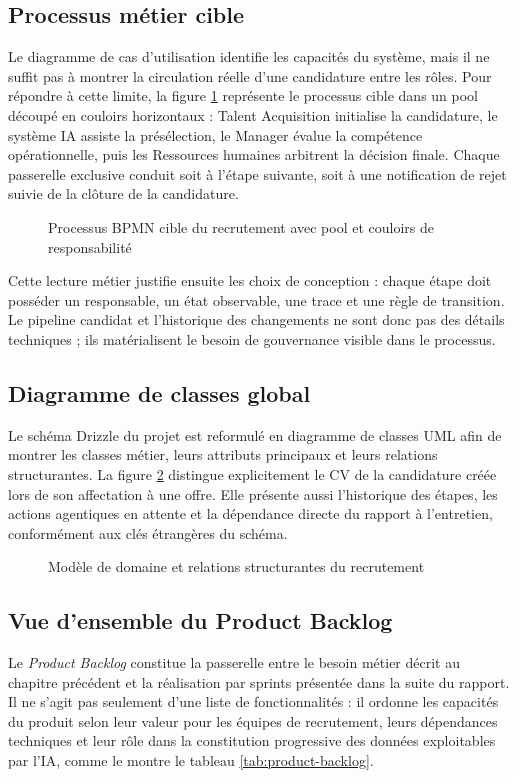 \subsection{Processus métier cible}
Le diagramme de cas d'utilisation identifie les capacités du système, mais il ne suffit pas à montrer la circulation réelle d'une candidature entre les rôles. Pour répondre à cette limite, la figure \ref{fig:business-bpmn} représente le processus cible dans un pool découpé en couloirs horizontaux : Talent Acquisition initialise la candidature, le système IA assiste la présélection, le Manager évalue la compétence opérationnelle, puis les Ressources humaines arbitrent la décision finale. Chaque passerelle exclusive conduit soit à l'étape suivante, soit à une notification de rejet suivie de la clôture de la candidature.

\begin{figure}[H]
  \centering
  \caption{\label{fig:business-bpmn}Processus BPMN cible du recrutement avec pool et couloirs de responsabilité}
\end{figure}

Cette lecture métier justifie ensuite les choix de conception : chaque étape doit posséder un responsable, un état observable, une trace et une règle de transition. Le pipeline candidat et l'historique des changements ne sont donc pas des détails techniques ; ils matérialisent le besoin de gouvernance visible dans le processus.

\subsection{Diagramme de classes global}
Le schéma Drizzle du projet est reformulé en diagramme de classes UML afin de montrer les classes métier, leurs attributs principaux et leurs relations structurantes. La figure \ref{fig:domain-model} distingue explicitement le CV de la candidature créée lors de son affectation à une offre. Elle présente aussi l'historique des étapes, les actions agentiques en attente et la dépendance directe du rapport à l'entretien, conformément aux clés étrangères du schéma.

\begin{figure}[H]
  \centering
  \caption{\label{fig:domain-model}Modèle de domaine et relations structurantes du recrutement}
\end{figure}

\subsection{Vue d'ensemble du Product Backlog}
Le \textit{Product Backlog} constitue la passerelle entre le besoin métier décrit au chapitre précédent et la réalisation par sprints présentée dans la suite du rapport. Il ne s'agit pas seulement d'une liste de fonctionnalités : il ordonne les capacités du produit selon leur valeur pour les équipes de recrutement, leurs dépendances techniques et leur rôle dans la constitution progressive des données exploitables par l'IA, comme le montre le tableau \ref{tab:product-backlog}.

